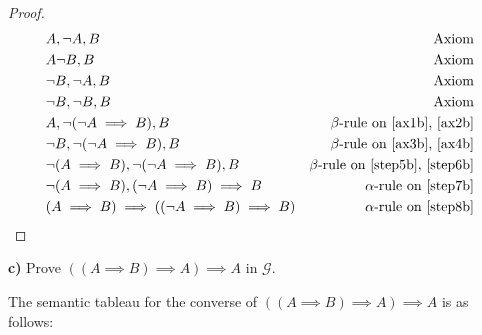 \documentclass[titlepage, letterpaper, fleqn]{article}
\newcommand{\spacepls}{\vspace{5mm}}
\begin{document}
\spacepls


\begin{proof}
\begin{align}
& A, \neg A, B & \text{Axiom} \label{ax1b}
\\ & A \neg B, B & \text{Axiom} \label{ax2b}
\\ & \neg B, \neg A, B & \text{Axiom} \label{ax3b}
\\ & \neg B, \neg B, B & \text{Axiom} \label{ax4b}
\\ & A, \neg(\neg A \implies B), B & \text{$\beta$-rule on \ref{ax1b}, \ref{ax2b}} \label{step5b}
\\ & \neg B, \neg(\neg A \implies B), B & \text{$\beta$-rule on \ref{ax3b}, \ref{ax4b}} \label{step6b}
\\ & \neg (A \implies B), \neg (\neg A \implies B), B & \text{$\beta$-rule on \ref{step5b}, \ref{step6b}} \label{step7b}
\\ & \neg (A \implies B), (\neg A \implies B) \implies B & \text{$\alpha$-rule on \ref{step7b}} \label{step8b}
\\ & (A \implies B) \implies ((\neg A \implies B)\implies B) & \text{$\alpha$-rule on \ref{step8b}}
\end{align}
\end{proof}

{\large \textbf{c)} Prove \(((A \implies B) \implies A) \implies A\) in \(\mathscr{G}\).}

The semantic tableau for the converse of \(((A \implies B) \implies A) \implies A\) is as follows:

\spacepls

\end{document}
